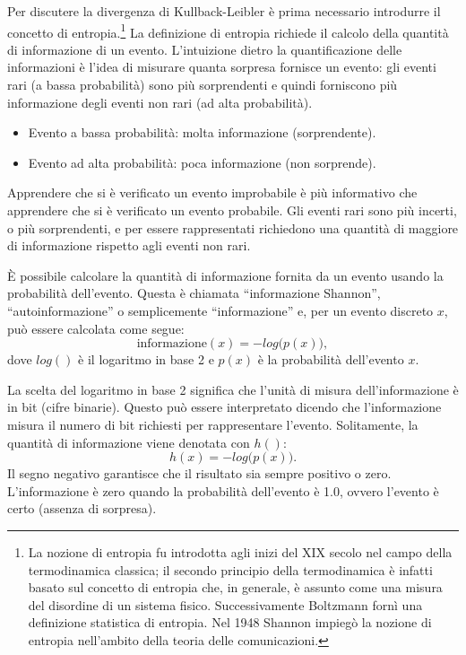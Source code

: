 \documentclass[
  10pt,
  italian,
  a4paper,
  extrafontsizes,onecolumn,openright
  ]{memoir}
\providecommand{\tightlist}{%
  \setlength{\itemsep}{0pt}\setlength{\parskip}{0pt}}
\theoremstyle{definition}
\theoremstyle{definition}
\theoremstyle{definition}
\theoremstyle{definition}
\theoremstyle{remark}
\begin{document}
Per discutere la divergenza di Kullback-Leibler è prima necessario introdurre il concetto di entropia.\footnote{La nozione di entropia fu introdotta agli inizi del XIX secolo nel campo della termodinamica classica; il secondo principio della termodinamica è infatti basato sul concetto di entropia che, in generale, è assunto come una misura del disordine di un sistema fisico. Successivamente Boltzmann fornì una definizione statistica di entropia. Nel 1948 Shannon impiegò la nozione di entropia nell'ambito della teoria delle comunicazioni.} La definizione di entropia richiede il calcolo della quantità di informazione di un evento. L'intuizione dietro la quantificazione delle informazioni è l'idea di misurare quanta sorpresa fornisce un evento: gli eventi rari (a bassa probabilità) sono più sorprendenti e quindi forniscono più informazione degli eventi non rari (ad alta probabilità).

\begin{itemize}
\tightlist
\item
  Evento a bassa probabilità: molta informazione (sorprendente).
\item
  Evento ad alta probabilità: poca informazione (non sorprende).
\end{itemize}

Apprendere che si è verificato un evento improbabile è più informativo che apprendere che si è verificato un evento probabile. Gli eventi rari sono più incerti, o più sorprendenti, e per essere rappresentati richiedono una quantità di maggiore di informazione rispetto agli eventi non rari.

È possibile calcolare la quantità di informazione fornita da un evento usando la probabilità dell'evento. Questa è chiamata ``informazione Shannon'', ``autoinformazione'' o semplicemente ``informazione'' e, per un evento discreto \(x\), può essere calcolata come segue:
\[
\text{informazione}(x) = -log\big( p(x) \big),
\]
dove \(log()\) è il logaritmo in base 2 e \(p(x)\) è la probabilità dell'evento \(x\).

La scelta del logaritmo in base 2 significa che l'unità di misura dell'informazione è in bit (cifre binarie). Questo può essere interpretato dicendo che l'informazione misura il numero di bit richiesti per rappresentare l'evento. Solitamente, la quantità di informazione viene denotata con \(h()\):
\[
h(x) = -log\big( p(x) \big).
\]
Il segno negativo garantisce che il risultato sia sempre positivo o zero. L'informazione è zero quando la probabilità dell'evento è 1.0, ovvero l'evento è certo (assenza di sorpresa).
\end{document}
